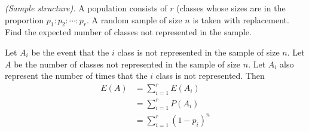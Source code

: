 \begin{problem}[Handout 6, \# 13]
  \emph{(Sample structure).} A population consists of \(r\) (classes whose
  sizes are in the proportion \(p_1:p_2:\dotsb:p_r\). A random sample of
  size \(n\) is taken with replacement. Find the expected number of classes
  not represented in the sample.
\end{problem}
\begin{solution}
  Let $A_i$ be the event that the $i$ class is not represented
  in the sample of size $n$. Let $A$ be the number of classes not
  represented in the sample of size $n$. Let $A_i$ also represent the
  number of times that the $i$ class is not represented. Then
\begin{align*}
  E(A) &=\sum_{i=1}^r E(A_i) \\
       &=\sum_{i=1}^r P(A_i) \\
       &=\sum_{i=1}^r (1-p_i)^n \\
\end{align*}
\end{solution}

